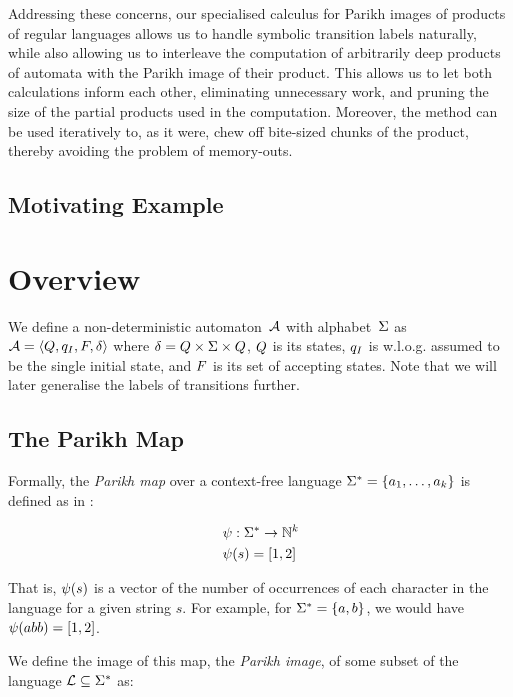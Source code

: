 \documentclass[acmsmall,review,anonymous]{acmart}\settopmatter{printfolios=true,printccs=false,printacmref=true}
\theoremstyle{definition}
\begin{document}
Addressing these concerns, our specialised calculus for Parikh images of
products of regular languages allows us to handle symbolic transition labels
naturally, while also allowing us to interleave the computation of arbitrarily
deep products of automata with the Parikh image of their product. This allows us
to let both calculations inform each other, eliminating unnecessary work, and
pruning the size of the partial products used in the computation. Moreover, the
method can be used iteratively to, as it were, chew off bite-sized chunks of the
product, thereby avoiding the problem of memory-outs.

\subsection{Motivating Example}


\section{Overview}

We define a non-deterministic automaton~$\Automaton$ with alphabet~$\Alphabet$
as $\Automaton = \AutomatonTuple$ where $\Transitions = \States \times \Alphabet
\times \States$, $\States$ is its states, $\InitialState$ is w.l.o.g. assumed to
be the single initial state, and $\AcceptingStates$ is its set of accepting
states. Note that we will later generalise the labels of transitions further.

\subsection{The Parikh Map}
Formally, the \textit{Parikh map} over a context-free language $\Strings=
\left\{a_1, \ldots, a_k \right\}$ is defined as in \cite{kozen}:

$$
\begin{aligned}
& \ParikhMap: \MapFromTo{\Strings}{\natural^k} \\
& \ParikhMap(s) = \VectorLiteral{\#a_1(s), \#a_2(s), \ldots, \#a_k(s)}
\end{aligned}
$$

That is, $\ParikhMap(s)$ is a vector of the number of occurrences of each
character in the language for a given string $s$. For example, for  $\Strings =
\Set{a, b}$, we would have $\ParikhMap(abb) = \VectorLiteral{1, 2}$.

We define the image of this map, the \textit{Parikh image}, of some subset of
the language $\Language \subseteq \Strings$ as:
\end{document}
